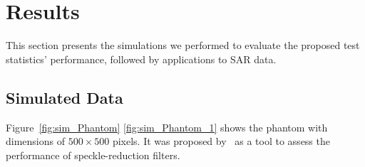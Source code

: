 \chapter{Results}\label{chp:results}

This section presents the simulations we performed to evaluate the
proposed test statistics' performance, followed by applications to SAR
data.

\section{Simulated Data}\label{simulated-data}

Figure~\ref{fig:sim_Phantom} \ref{fig:sim_Phantom_1} shows the phantom with dimensions of
\(500\times500\) pixels.
 It was proposed by~\citet{Gomez2017} as a tool
to assess the performance of speckle-reduction filters.

